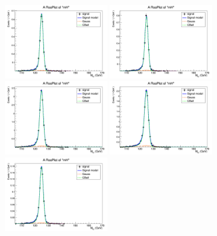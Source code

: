 \begin{figure}[htb]
	\begin{center}
		\includegraphics[width=0.40\textwidth]{fig/signal_fit/2017/sigfit_mu_ggF_1_125.png}
		\includegraphics[width=0.40\textwidth]{fig/signal_fit/2017/sigfit_mu_ggF_2_125.png}\\
		\includegraphics[width=0.40\textwidth]{fig/signal_fit/2017/sigfit_mu_ggF_3_125.png}
		\includegraphics[width=0.40\textwidth]{fig/signal_fit/2017/sigfit_mu_ggF_4_125.png}\\
		\includegraphics[width=0.40\textwidth]{fig/signal_fit/2017/sigfit_mu_VBF_501_125.png}

\end{center}
\end{figure}
